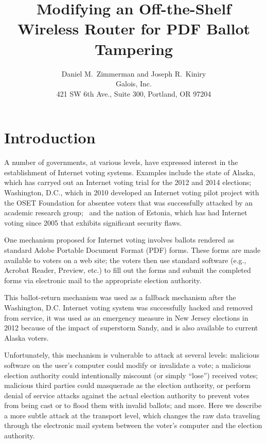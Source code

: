 \documentclass{article}
\newcommand{\eg}{e.g.,\xspace}
\newcommand{\etc}{etc.\xspace}
\begin{document}
\title{Modifying an Off-the-Shelf Wireless Router for PDF Ballot Tampering}
\author{Daniel M.~Zimmerman and Joseph R.~Kiniry \\ Galois, Inc. \\
  421 SW 6th Ave., Suite 300, Portland, OR 97204}

\maketitle


\section{Introduction}

A number of governments, at various levels, have expressed interest in
the establishment of Internet voting systems. Examples include the
state of Alaska, which has carryed out an Internet voting trial for
the 2012 and 2014 elections; Washington, D.C., which in 2010 developed
an Internet voting pilot project with the OSET Foundation for absentee
voters that was successfully attacked by an academic research
group;~\cite{DCVoting} and the nation of Estonia, which has had
Internet voting since 2005 that exhibits significant security
flaws.~\cite{EstoniaEVoting}

One mechanism proposed for Internet voting involves ballots rendered
as standard Adobe Portable Document Format (PDF) forms. These forms
are made available to voters on a web site; the voters then use
standard software (\eg Acrobat Reader, Preview, \etc) to fill out the
forms and submit the completed forms via electronic mail to the
appropriate election authority.

This ballot-return mechanism was used as a fallback mechanism after
the Washington, D.C. Internet voting system was successfully hacked
and removed from service, it was used as an emergency measure in New
Jersey elections in 2012 because of the impact of superstorm Sandy,
and is also available to current Alaska voters.

Unfortunately, this mechanism is vulnerable to attack at several
levels: malicious software on the user's computer could modify or
invalidate a vote; a malicious election authority could intentionally
miscount (or simply ``lose'') received votes; malicious third parties
could masquerade as the election authority, or perform denial of
service attacks against the actual election authority to prevent votes
from being cast or to flood them with invalid ballots; and more. Here
we describe a more subtle attack at the transport level, which changes
the raw data traveling through the electronic mail system between the
voter's computer and the election authority.
\end{document}
